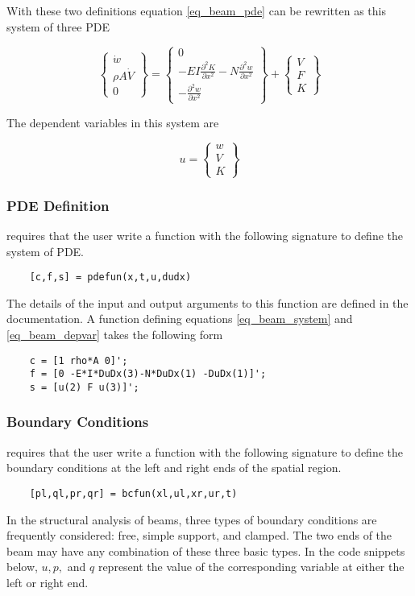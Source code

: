 \documentclass{article}
\begin{document}
With these two definitions equation \eqref{eq_beam_pde} can be rewritten as
this system of three PDE

\begin{equation}\label{eq_beam_system}
	\left\{\begin{array}{c}
		\dot w \\ \rho A \dot V \\ 0
	\end{array}\right\} =
	\left\{\begin{array}{c}
		0 \\ -EI\frac{\partial^2 K}{\partial x^2} -N\frac{\partial^2 w}{\partial x^2} \\
		-\frac{\partial^2 w}{\partial x^2}
	\end{array}\right\} +
	\left\{\begin{array}{c}
		V \\ F \\ K
	\end{array}\right\}
\end{equation}

The dependent variables in this system are

\begin{equation}\label{eq_beam_depvar}
	u = \left\{\begin{array}{c} w \\ V \\ K \end{array}\right\}
\end{equation}

\subsubsection{PDE Definition}
\pde requires that the user write a function with the following signature  to
define the system of PDE.
\begin{lstlisting}
	[c,f,s] = pdefun(x,t,u,dudx)
\end{lstlisting}
The details of the input and output arguments to this function are defined in
the \pde documentation.
A  function defining equations 
\eqref{eq_beam_system} and \eqref{eq_beam_depvar} takes the following form
\begin{lstlisting}
	c = [1 rho*A 0]';
	f = [0 -E*I*DuDx(3)-N*DuDx(1) -DuDx(1)]';
	s = [u(2) F u(3)]';
\end{lstlisting}
\subsubsection{Boundary Conditions}
\pde requires that the user write a function with the following signature to
define the boundary conditions at the left and right ends of the spatial
region.
\begin{lstlisting}
	[pl,ql,pr,qr] = bcfun(xl,ul,xr,ur,t)
\end{lstlisting}
In the structural analysis of beams, three types of boundary conditions are frequently considered: free, simple support, and clamped. The two ends of the
beam may have any combination of these three basic types. In the code snippets
below, $u, p,$ and $q$ represent the value of the corresponding variable at
either the left or right end.
\end{document}
